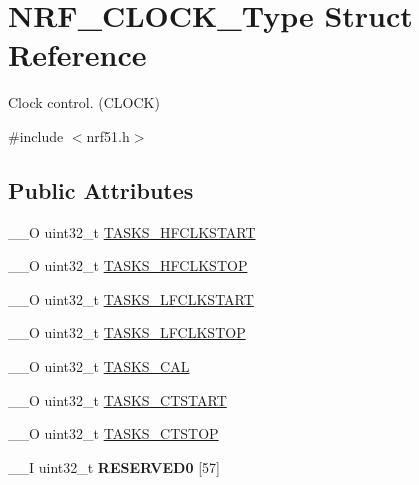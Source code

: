 \hypertarget{struct_n_r_f___c_l_o_c_k___type}{}\section{N\+R\+F\+\_\+\+C\+L\+O\+C\+K\+\_\+\+Type Struct Reference}
\label{struct_n_r_f___c_l_o_c_k___type}


Clock control. (C\+L\+O\+C\+K)  




{\ttfamily \#include $<$nrf51.\+h$>$}

\subsection*{Public Attributes}
\begin{DoxyCompactItemize}
\item 
\+\_\+\+\_\+\+O uint32\+\_\+t \hyperlink{struct_n_r_f___c_l_o_c_k___type_a31392b7130deec52ea6ae10c418c3fea}{T\+A\+S\+K\+S\+\_\+\+H\+F\+C\+L\+K\+S\+T\+A\+R\+T}
\item 
\+\_\+\+\_\+\+O uint32\+\_\+t \hyperlink{struct_n_r_f___c_l_o_c_k___type_a46c1b1b558d6639d547333a9f602e550}{T\+A\+S\+K\+S\+\_\+\+H\+F\+C\+L\+K\+S\+T\+O\+P}
\item 
\+\_\+\+\_\+\+O uint32\+\_\+t \hyperlink{struct_n_r_f___c_l_o_c_k___type_aebb29ad08649cd356dcd6a5137ad858a}{T\+A\+S\+K\+S\+\_\+\+L\+F\+C\+L\+K\+S\+T\+A\+R\+T}
\item 
\+\_\+\+\_\+\+O uint32\+\_\+t \hyperlink{struct_n_r_f___c_l_o_c_k___type_a004a3b7b6d3d125cba60e47ca66602f3}{T\+A\+S\+K\+S\+\_\+\+L\+F\+C\+L\+K\+S\+T\+O\+P}
\item 
\+\_\+\+\_\+\+O uint32\+\_\+t \hyperlink{struct_n_r_f___c_l_o_c_k___type_a5293a0b481af280e8dd6996e1e6b4d7a}{T\+A\+S\+K\+S\+\_\+\+C\+A\+L}
\item 
\+\_\+\+\_\+\+O uint32\+\_\+t \hyperlink{struct_n_r_f___c_l_o_c_k___type_ae715f43f5fcfb266bc8704af54626bb2}{T\+A\+S\+K\+S\+\_\+\+C\+T\+S\+T\+A\+R\+T}
\item 
\+\_\+\+\_\+\+O uint32\+\_\+t \hyperlink{struct_n_r_f___c_l_o_c_k___type_aca842caf73c99cdeac3a53fa72682de2}{T\+A\+S\+K\+S\+\_\+\+C\+T\+S\+T\+O\+P}
\item 
\hypertarget{struct_n_r_f___c_l_o_c_k___type_ac2cc186228bf7c5daee556c048187969}{}\+\_\+\+\_\+\+I uint32\+\_\+t {\bfseries R\+E\+S\+E\+R\+V\+E\+D0} \mbox{[}57\mbox{]}\label{struct_n_r_f___c_l_o_c_k___type_ac2cc186228bf7c5daee556c048187969}


\end{DoxyCompactItemize}
